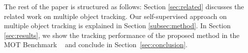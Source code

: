 The rest of the paper is structured as follows: 
Section \ref{sec:related} discusses the related work on multiple object tracking. 
Our self-supervised approach on multiple object tracking is explained in Section \ref{subsec:method}. 
In Section \ref{sec:results}, we show the tracking performance of the proposed method in the MOT Benchmark ~\cite{MOT16} and conclude in  %
 Section~\ref{sec:conclusion}.



